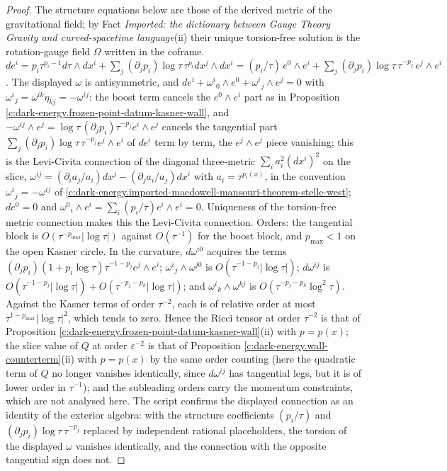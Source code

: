 \documentclass[11pt]{article}
\theoremstyle{definition}
\theoremstyle{plain}
\begin{document}
\begin{proof}
The structure equations below are those of the derived metric of the gravitational field; by Fact \emph{Imported: the dictionary between Gauge Theory Gravity and curved-spacetime language}(ii) their unique torsion-free solution is the rotation-gauge field $\Omega$ written in the coframe. $de^i = p_i\tau^{p_i-1}d\tau\wedge dx^i + \sum_j(\partial_jp_i)\log\tau\,\tau^{p_i}dx^j\wedge dx^i = (p_i/\tau)\,e^0\wedge e^i + \sum_j(\partial_jp_i)\log\tau\,\tau^{-p_j}\,e^j\wedge e^i$. The displayed $\omega$ is antisymmetric, and $de^i + \omega^{i}{}_{0}\wedge e^0 + \omega^{i}{}_{j}\wedge e^j = 0$ with $\omega^{i}{}_{j} = \omega^{ik}\eta_{kj} = -\omega^{ij}$: the boost term cancels the $e^0\wedge e^i$ part as in Proposition \ref{c:dark-energy.frozen-point-datum-kasner-wall}, and $-\omega^{ij}\wedge e^j = \log\tau\,(\partial_jp_i)\tau^{-p_j}e^i\wedge e^j$ cancels the tangential part $\sum_j(\partial_jp_i)\log\tau\,\tau^{-p_j}e^j\wedge e^i$ of $de^i$ term by term, the $e^j\wedge e^j$ piece vanishing; this is the Levi-Civita connection of the diagonal three-metric $\sum_i a_i^2(dx^i)^2$ on the slice, $\omega^{ij} = (\partial_i a_j/a_i)dx^j - (\partial_j a_i/a_j)dx^i$ with $a_i = \tau^{p_i(x)}$, in the convention $\omega^{i}{}_{j} = -\omega^{ij}$ of \ref{c:dark-energy.imported-macdowell-mansouri-theorem-stelle-west}; $de^0 = 0$ and $\omega^{0}{}_{i}\wedge e^i = \sum_i(p_i/\tau)e^i\wedge e^i = 0$. Uniqueness of the torsion-free metric connection makes this the Levi-Civita connection. Orders: the tangential block is $O(\tau^{-p_{\max}}|\log\tau|)$ against $O(\tau^{-1})$ for the boost block, and $p_{\max} < 1$ on the open Kasner circle. In the curvature, $d\omega^{i0}$ acquires the terms $(\partial_jp_i)(1 + p_i\log\tau)\tau^{-1-p_j}e^j\wedge e^i$; $\omega^{i}{}_{j}\wedge\omega^{j0}$ is $O(\tau^{-1-p_j}|\log\tau|)$; $d\omega^{ij}$ is $O(\tau^{-1-p_j}|\log\tau|) + O(\tau^{-p_j-p_k}|\log\tau|)$; and $\omega^{i}{}_{k}\wedge\omega^{kj}$ is $O(\tau^{-p_j-p_k}\log^2\tau)$. Against the Kasner terms of order $\tau^{-2}$, each is of relative order at most $\tau^{1-p_{\max}}|\log\tau|^2$, which tends to zero. Hence the Ricci tensor at order $\tau^{-2}$ is that of Proposition \ref{c:dark-energy.frozen-point-datum-kasner-wall}(ii) with $p = p(x)$; the slice value of $Q$ at order $\varepsilon^{-2}$ is that of Proposition \ref{c:dark-energy.wall-counterterm}(ii) with $p = p(x)$ by the same order counting (here the quadratic term of $Q$ no longer vanishes identically, since $d\omega^{ij}$ has tangential legs, but it is of lower order in $\tau^{-1}$); and the subleading orders carry the momentum constraints, which are not analysed here. The script confirms the displayed connection as an identity of the exterior algebra: with the structure coefficients $(p_i/\tau)$ and $(\partial_jp_i)\log\tau\,\tau^{-p_j}$ replaced by independent rational placeholders, the torsion of the displayed $\omega$ vanishes identically, and the connection with the opposite tangential sign does not.

\end{proof}
\end{document}
